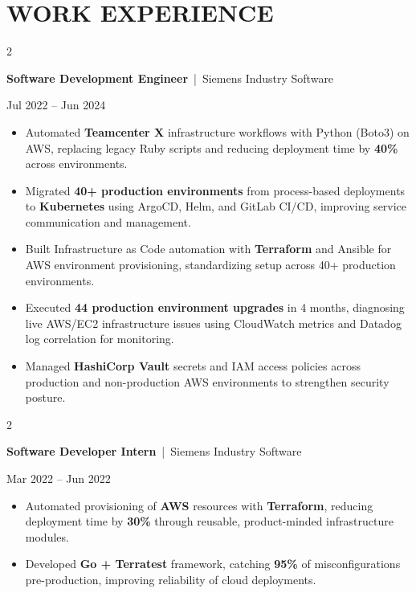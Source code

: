 \documentclass[10pt, letterpaper]{article}
\newenvironment{highlights}{
    \begin{itemize}[
        topsep=0.10 cm,
        parsep=0.06 cm,
        partopsep=0pt,
        itemsep=0.06 cm,
        leftmargin=12pt
    ]
}{
    \end{itemize}
}
\newenvironment{twocolentry}[2][]{
    \onecolentry
    \def\secondColumn{#2}
    \setcolumnwidth{\fill, 4.5 cm}
    \begin{paracol}{2}
}{
    \switchcolumn \raggedleft \secondColumn
    \end{paracol}
    \endonecolentry
}
\begin{document}
\section{WORK EXPERIENCE}
\begin{twocolentry}{Jul 2022 -- Jun 2024}
\textbf{Software Development Engineer} \,|\, Siemens Industry Software
\end{twocolentry}
\begin{highlights}
  \item Automated \textbf{Teamcenter X} infrastructure workflows with Python (Boto3) on AWS, replacing legacy Ruby scripts and reducing deployment time by \textbf{40\%} across environments.
  \item Migrated \textbf{40+ production environments} from process-based deployments to \textbf{Kubernetes} using ArgoCD, Helm, and GitLab CI/CD, improving service communication and management.
  \item Built Infrastructure as Code automation with \textbf{Terraform} and Ansible for AWS environment provisioning, standardizing setup across 40+ production environments.
  \item Executed \textbf{44 production environment upgrades} in 4 months, diagnosing live AWS/EC2 infrastructure issues using CloudWatch metrics and Datadog log correlation for monitoring.
  \item Managed \textbf{HashiCorp Vault} secrets and IAM access policies across production and non-production AWS environments to strengthen security posture.
\end{highlights}

\vspace{0.15 cm}

\begin{twocolentry}{Mar 2022 -- Jun 2022}
\textbf{Software Developer Intern} \,|\, Siemens Industry Software
\end{twocolentry}
\begin{highlights}
  \item Automated provisioning of \textbf{AWS} resources with \textbf{Terraform}, reducing deployment time by \textbf{30\%} through reusable, product-minded infrastructure modules.
  \item Developed \textbf{Go + Terratest} framework, catching \textbf{95\%} of misconfigurations pre-production, improving reliability of cloud deployments.
\end{highlights}

\vspace{0.15 cm}
\end{document}
